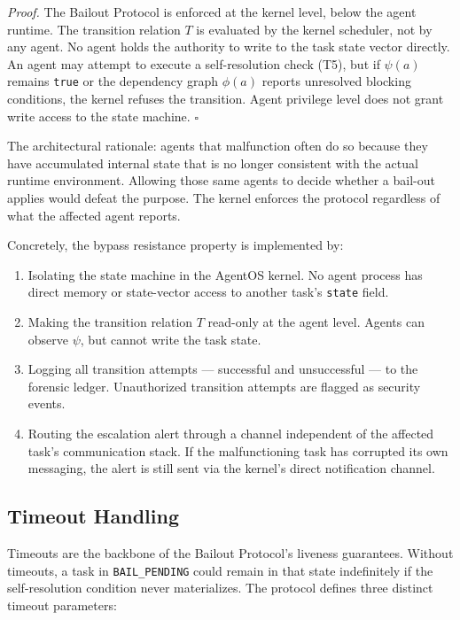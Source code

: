 \medskip\noindent\textit{Proof.} The Bailout Protocol is enforced at the kernel level, below the agent runtime. The transition relation $T$ is evaluated by the kernel scheduler, not by any agent. No agent holds the authority to write to the task state vector directly. An agent may attempt to execute a self-resolution check (T5), but if $\psi(a)$ remains \texttt{true} or the dependency graph $\phi(a)$ reports unresolved blocking conditions, the kernel refuses the transition. Agent privilege level does not grant write access to the state machine. $\square$

The architectural rationale: agents that malfunction often do so because they have accumulated internal state that is no longer consistent with the actual runtime environment. Allowing those same agents to decide whether a bail-out applies would defeat the purpose. The kernel enforces the protocol regardless of what the affected agent reports.

Concretely, the bypass resistance property is implemented by:
\begin{enumerate}
\item Isolating the state machine in the AgentOS kernel. No agent process has direct memory or state-vector access to another task's \texttt{state} field.
\item Making the transition relation $T$ read-only at the agent level. Agents can observe $\psi$, but cannot write the task state.
\item Logging all transition attempts — successful and unsuccessful — to the forensic ledger. Unauthorized transition attempts are flagged as security events.
\item Routing the escalation alert through a channel independent of the affected task's communication stack. If the malfunctioning task has corrupted its own messaging, the alert is still sent via the kernel's direct notification channel.
\end{enumerate}

\subsection{Timeout Handling}

Timeouts are the backbone of the Bailout Protocol's liveness guarantees. Without timeouts, a task in \texttt{BAIL\_PENDING} could remain in that state indefinitely if the self-resolution condition never materializes. The protocol defines three distinct timeout parameters:

